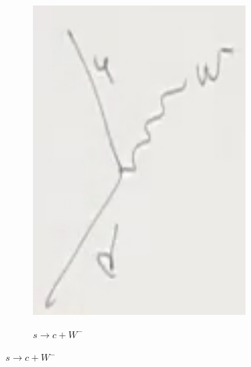 \documentclass[]{article}
\begin{document}
\begin{figure}[H]
\begin{subfigure}{0.2\textwidth}
		\includegraphics[width=0.9\textwidth]{2-5-W2}
	\end{subfigure}
	\begin{subfigure}{0.2\textwidth}
		\caption{$s \rightarrow c + W^-$}

\end{subfigure}
\end{figure}
\end{document}
